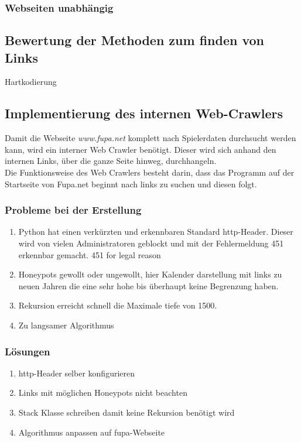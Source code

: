 		\subsubsection{Webseiten unabhängig}
	\subsection{Bewertung der Methoden zum finden von Links}
	Hartkodierung
	\subsection{Implementierung des internen Web-Crawlers}
	Damit die Webseite \textit{www.fupa.net} komplett nach Spielerdaten durchsucht werden kann, wird ein interner Web Crawler benötigt. Dieser wird sich anhand den internen Links, über die ganze Seite hinweg, durchhangeln.\\
	Die Funktionsweise des Web Crawlers besteht darin, dass das Programm auf der Startseite von Fupa.net beginnt nach links zu suchen und diesen folgt.
	\subsubsection{Probleme bei der Erstellung} %
	\begin{enumerate}
		\item Python hat einen verkürzten und erkennbaren Standard http-Header. Dieser wird von vielen Administratoren geblockt und mit der Fehlermeldung 451 erkennbar gemacht. 451 for legal reason
		\item Honeypots gewollt oder ungewollt, hier Kalender darstellung mit links zu neuen Jahren die eine sehr hohe bis überhaupt keine Begrenzung haben.
		\item Rekursion erreicht schnell die Maximale tiefe von 1500.
		\item Zu langsamer Algorithmus
	\end{enumerate}
	\subsubsection{Lösungen}
	\begin{enumerate}
		\item http-Header selber konfigurieren
		\item Links mit möglichen Honeypots nicht beachten
		\item Stack Klasse schreiben damit keine Rekursion benötigt wird
		\item Algorithmus anpassen auf fupa-Webseite
	\end{enumerate}
